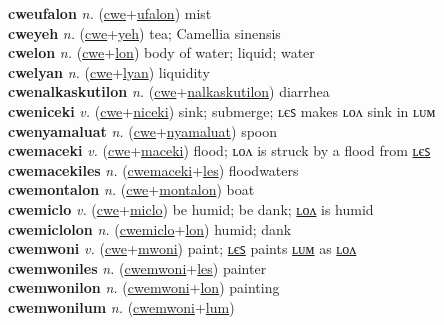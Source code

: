 \textbf{cweufalon} \textit{n.} (\hyperref[cwe]{cwe}+\hyperref[ufalon]{ufalon})
mist \label{cweufalon} \\
\textbf{cweyeh} \textit{n.} (\hyperref[cwe]{cwe}+\hyperref[yeh]{yeh})
tea; Camellia sinensis \label{cweyeh} \\
\textbf{cwelon} \textit{n.} (\hyperref[cwe]{cwe}+\hyperref[lon]{lon})
body of water; liquid; water \label{cwelon} \\
\textbf{cwelyan} \textit{n.} (\hyperref[cwe]{cwe}+\hyperref[lyan]{lyan})
liquidity \label{cwelyan} \\
\textbf{cwenalkaskutilon} \textit{n.} (\hyperref[cwe]{cwe}+\hyperref[nalkaskutilon]{nalkaskutilon})
diarrhea \label{cwenalkaskutilon} \\
\textbf{cweniceki} \textit{v.} (\hyperref[cwe]{cwe}+\hyperref[niceki]{niceki})
sink; submerge; ʟєꜱ makes ʟᴏᴧ sink in ʟᴜᴍ \label{cweniceki} \\
\textbf{cwenyamaluat} \textit{n.} (\hyperref[cwe]{cwe}+\hyperref[nyamaluat]{nyamaluat})
spoon \label{cwenyamaluat} \\
\textbf{cwemaceki} \textit{v.} (\hyperref[cwe]{cwe}+\hyperref[maceki]{maceki})
flood; ʟᴏᴧ is struck by a flood from \hyperref[cwemacekiles]{ʟєꜱ} \label{cwemaceki} \\
\textbf{cwemacekiles} \textit{n.} (\hyperref[cwemaceki]{cwemaceki}+\hyperref[les]{les})
floodwaters \label{cwemacekiles} \\
\textbf{cwemontalon} \textit{n.} (\hyperref[cwe]{cwe}+\hyperref[montalon]{montalon})
boat \label{cwemontalon} \\
\textbf{cwemiclo} \textit{v.} (\hyperref[cwe]{cwe}+\hyperref[miclo]{miclo})
be humid; be dank; \hyperref[cwemiclolon]{ʟᴏᴧ} is humid \label{cwemiclo} \\
\textbf{cwemiclolon} \textit{n.} (\hyperref[cwemiclo]{cwemiclo}+\hyperref[lon]{lon})
humid; dank \label{cwemiclolon} \\
\textbf{cwemwoni} \textit{v.} (\hyperref[cwe]{cwe}+\hyperref[mwoni]{mwoni})
paint; \hyperref[cwemwoniles]{ʟєꜱ} paints \hyperref[cwemwonilum]{ʟᴜᴍ} as \hyperref[cwemwonilon]{ʟᴏᴧ} \label{cwemwoni} \\
\textbf{cwemwoniles} \textit{n.} (\hyperref[cwemwoni]{cwemwoni}+\hyperref[les]{les})
painter \label{cwemwoniles} \\
\textbf{cwemwonilon} \textit{n.} (\hyperref[cwemwoni]{cwemwoni}+\hyperref[lon]{lon})
painting \label{cwemwonilon} \\
\textbf{cwemwonilum} \textit{n.} (\hyperref[cwemwoni]{cwemwoni}+\hyperref[lum]{lum})
